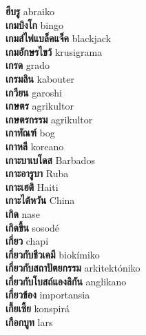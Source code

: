 \textbf{ ฮีบรู  } abraiko \\
\textbf{ เกมบิงโก  } bingo \\
\textbf{ เกมส์ไพ่แบล็คแจ็ค  } blackjack \\
\textbf{ เกมอักษรไขว้  } krusigrama \\
\textbf{ เกรด  } grado \\
\textbf{ เกรมลิน  } kabouter \\
\textbf{ เกวียน  } garoshi \\
\textbf{ เกษตร  } agrikultor \\
\textbf{ เกษตรกรรม  } agrikultor \\
\textbf{ เกาทัณฑ์  } bog \\
\textbf{ เกาหลี  } koreano \\
\textbf{ เกาะบาเบโดส  } Barbados \\
\textbf{ เกาะอารูบา  } Ruba \\
\textbf{ เกาะเฮติ  } Haiti \\
\textbf{ เกาะไต้หวัน  } China \\
\textbf{ เกิด  } nase \\
\textbf{ เกิดขึ้น  } sosodé \\
\textbf{ เกี่ยว  } chapi \\
\textbf{ เกี่ยวกับชีวเคมี  } biokímiko \\
\textbf{ เกี่ยวกับสถาปัตยกรรม  } arkitektóniko \\
\textbf{ เกี่ยวกับโบสถ์แองลิกัน  } anglikano \\
\textbf{ เกี่ยวข้อง  } importansia \\
\textbf{ เกี้ยเซี้ย  } konspirá \\
\textbf{ เกือกบูท  } lars \\

